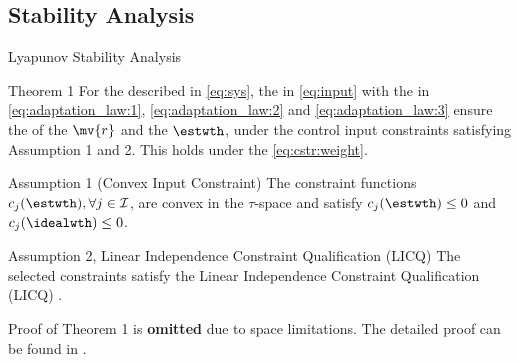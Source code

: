 \documentclass[8pt, aspectratio=169]{beamer}
\newcommand{\ctxt}[2]{\color{#1}{#2}\color{black} }
\begin{document}
\subsection{Stability Analysis}

\begin{frame}{\insertsubsectionhead}{Lyapunov Stability Analysis}

  \centering
  \begin{minipage}{.9\textwidth}

    \begin{block}{Theorem 1 \cite{Ryu:2025aa}}
      For the \ctxt{airforceblue}{dynamical system } described in \eqref{eq:sys}, the \ctxt{awesome}{neuro-adaptive controller } in \eqref{eq:input} with the \ctxt{airforceblue}{weight adaptation laws } in \eqref{eq:adaptation_law:1}, \eqref{eq:adaptation_law:2} and \eqref{eq:adaptation_law:3} ensure the \ctxt{airforceblue}{boundedness } of the \ctxt{awesome}{filtered error } $\mv{r}$ and the \ctxt{awesome}{weight estimate } $\estwth$, under the control input constraints satisfying Assumption 1 and 2. This holds under the \ctxt{awesome}{weight norm constraint } \eqref{eq:cstr:weight}.
    \end{block}

    \begin{exampleblock}{Assumption 1 (Convex Input Constraint)}
      The constraint functions $c_j(\estwth),\forall j\in\mathcal{I}$, are convex in the $\tau$-space and satisfy $c_j(\estwth)\le0$ and $c_j(\idealwth)\le0$.
    \end{exampleblock}

    \begin{exampleblock}{Assumption 2, Linear Independence Constraint Qualification (LICQ)}
      The selected constraints satisfy the Linear Independence Constraint Qualification (LICQ) \cite[Chap. 12 Def. 12.1]{Nocedal:2006aa}.
    \end{exampleblock}

  \end{minipage}

  \vspace{.2cm}

  Proof of Theorem 1 is \textbf{omitted } due to space limitations. The detailed proof can be found in \cite{Ryu:2025aa}.

\end{frame}

\end{document}
